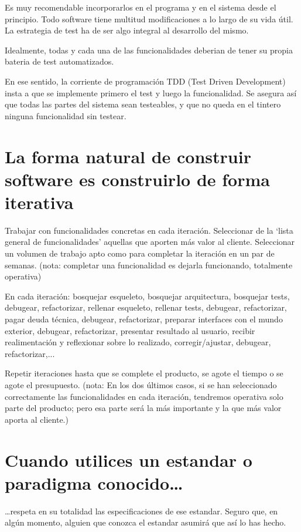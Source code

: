 \documentclass[spanish,12pt,a4paper,final,oneside]{book}
\begin{document}
Es muy recomendable incorporarlos en el programa y en el sistema desde el principio. Todo software tiene multitud modificaciones a lo largo de su vida útil. La estrategia de test ha de ser algo integral al desarrollo del mismo.

Idealmente, todas y cada una de las funcionalidades deberian de tener su propia bateria de test automatizados.

En ese sentido, la corriente de programación TDD (Test Driven Development) insta a que se implemente primero el test y luego la funcionalidad. Se asegura así que todas las partes del sistema sean testeables, y que no queda en el tintero ninguna funcionalidad sin testear.

\section{La forma natural de construir software es construirlo de forma iterativa}
Trabajar con funcionalidades concretas en cada iteración.
Seleccionar de la `lista general de funcionalidades' aquellas que aporten más valor al cliente. Seleccionar un volumen de trabajo apto como para completar la iteración en un par de semanas. (nota: completar una funcionalidad es dejarla funcionando, totalmente operativa)

En cada iteración: bosquejar esqueleto, bosquejar arquitectura, bosquejar tests, debugear, refactorizar, rellenar esqueleto, rellenar tests,  debugear, refactorizar, pagar deuda técnica, debugear, refactorizar, preparar interfaces con el mundo exterior, debugear, refactorizar, presentar resultado al usuario, recibir realimentación y reflexionar sobre lo realizado, corregir/ajustar, debugear, refactorizar,...

Repetir iteraciones hasta que se complete el producto, se agote el tiempo o se agote el presupuesto. (nota: En los dos últimos casos, si se han seleccionado correctamente las funcionalidades en cada iteración, tendremos operativa solo parte del producto; pero esa parte será la más importante y la que más valor aporta al cliente.)


\section{Cuando utilices un estandar o paradigma conocido\ldots}
\ldots respeta en su totalidad las especificaciones de ese estandar. Seguro que, en algún momento, alguien que conozca el estandar asumirá que así lo has hecho.
\end{document}
